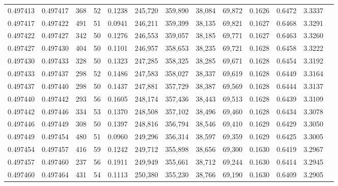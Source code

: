 \begin{tabular}{rrrrrrrrrrrrr}
0.497413 & 0.497417 & 368 &  52 &                                     0.1238 & 245,720 & 359,890 &  38,084 &  69,872 & 0.1626 & 0.6472 & 3.3337 \\
0.497417 & 0.497422 & 491 &  51 &                                     0.0941 & 246,211 & 359,399 &  38,135 &  69,821 & 0.1627 & 0.6468 & 3.3291 \\
0.497422 & 0.497427 & 342 &  50 &                                     0.1276 & 246,553 & 359,057 &  38,185 &  69,771 & 0.1627 & 0.6463 & 3.3260 \\
0.497427 & 0.497430 & 404 &  50 &                                     0.1101 & 246,957 & 358,653 &  38,235 &  69,721 & 0.1628 & 0.6458 & 3.3222 \\
0.497430 & 0.497433 & 328 &  50 &                                     0.1323 & 247,285 & 358,325 &  38,285 &  69,671 & 0.1628 & 0.6454 & 3.3192 \\
0.497433 & 0.497437 & 298 &  52 &                                     0.1486 & 247,583 & 358,027 &  38,337 &  69,619 & 0.1628 & 0.6449 & 3.3164 \\
0.497437 & 0.497440 & 298 &  50 &                                     0.1437 & 247,881 & 357,729 &  38,387 &  69,569 & 0.1628 & 0.6444 & 3.3137 \\
0.497440 & 0.497442 & 293 &  56 &                                     0.1605 & 248,174 & 357,436 &  38,443 &  69,513 & 0.1628 & 0.6439 & 3.3109 \\
0.497442 & 0.497446 & 334 &  53 &                                     0.1370 & 248,508 & 357,102 &  38,496 &  69,460 & 0.1628 & 0.6434 & 3.3078 \\
0.497446 & 0.497449 & 308 &  50 &                                     0.1397 & 248,816 & 356,794 &  38,546 &  69,410 & 0.1629 & 0.6429 & 3.3050 \\
0.497449 & 0.497454 & 480 &  51 &                                     0.0960 & 249,296 & 356,314 &  38,597 &  69,359 & 0.1629 & 0.6425 & 3.3005 \\
0.497454 & 0.497457 & 416 &  59 &                                     0.1242 & 249,712 & 355,898 &  38,656 &  69,300 & 0.1630 & 0.6419 & 3.2967 \\
0.497457 & 0.497460 & 237 &  56 &                                     0.1911 & 249,949 & 355,661 &  38,712 &  69,244 & 0.1630 & 0.6414 & 3.2945 \\
0.497460 & 0.497464 & 431 &  54 &                                     0.1113 & 250,380 & 355,230 &  38,766 &  69,190 & 0.1630 & 0.6409 & 3.2905 \\

\end{tabular}
